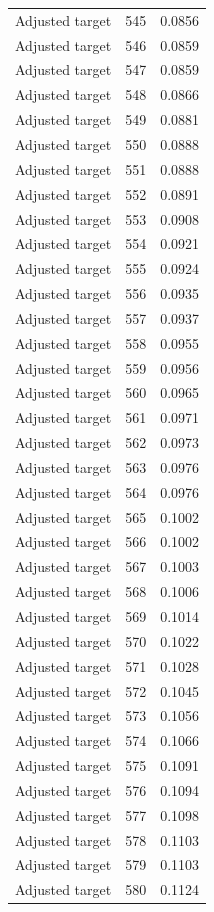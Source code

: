 \begin{table}[htbp]
\begin{tabular}{lll}
Adjusted target & 545 & 0.0856 \\
Adjusted target & 546 & 0.0859 \\
Adjusted target & 547 & 0.0859 \\
Adjusted target & 548 & 0.0866 \\
Adjusted target & 549 & 0.0881 \\
Adjusted target & 550 & 0.0888 \\
Adjusted target & 551 & 0.0888 \\
Adjusted target & 552 & 0.0891 \\
Adjusted target & 553 & 0.0908 \\
Adjusted target & 554 & 0.0921 \\
Adjusted target & 555 & 0.0924 \\
Adjusted target & 556 & 0.0935 \\
Adjusted target & 557 & 0.0937 \\
Adjusted target & 558 & 0.0955 \\
Adjusted target & 559 & 0.0956 \\
Adjusted target & 560 & 0.0965 \\
Adjusted target & 561 & 0.0971 \\
Adjusted target & 562 & 0.0973 \\
Adjusted target & 563 & 0.0976 \\
Adjusted target & 564 & 0.0976 \\
Adjusted target & 565 & 0.1002 \\
Adjusted target & 566 & 0.1002 \\
Adjusted target & 567 & 0.1003 \\
Adjusted target & 568 & 0.1006 \\
Adjusted target & 569 & 0.1014 \\
Adjusted target & 570 & 0.1022 \\
Adjusted target & 571 & 0.1028 \\
Adjusted target & 572 & 0.1045 \\
Adjusted target & 573 & 0.1056 \\
Adjusted target & 574 & 0.1066 \\
Adjusted target & 575 & 0.1091 \\
Adjusted target & 576 & 0.1094 \\
Adjusted target & 577 & 0.1098 \\
Adjusted target & 578 & 0.1103 \\
Adjusted target & 579 & 0.1103 \\
Adjusted target & 580 & 0.1124 \\

\end{tabular}
\end{table}
